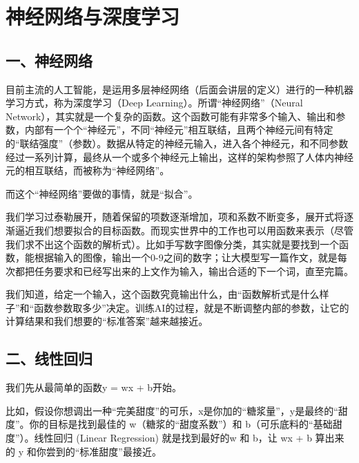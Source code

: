 \clearpage

\hypertarget{ux795eux7ecfux7f51ux7edcux4e0eux6df1ux5ea6ux5b66ux4e60}{%
\section{神经网络与深度学习}\label{ux795eux7ecfux7f51ux7edcux4e0eux6df1ux5ea6ux5b66ux4e60}}

\hypertarget{ux4e00ux795eux7ecfux7f51ux7edc}{%
\subsection{一、神经网络}\label{ux4e00ux795eux7ecfux7f51ux7edc}}

目前主流的人工智能，是运用多层神经网络（后面会讲层的定义）进行的一种机器学习方式，称为深度学习（Deep Learning）。所谓``神经网络''（Neural Network），其实就是一个复杂的函数。这个函数可能有非常多个输入、输出和参数，内部有一个个``神经元''，不同``神经元''相互联结，且两个神经元间有特定的``联结强度''（参数）。数据从特定的神经元输入，进入各个神经元，和不同参数经过一系列计算，最终从一个或多个神经元上输出，这样的架构参照了人体内神经元的相互联结，而被称为``神经网络''。

而这个``神经网络''要做的事情，就是``拟合''。

我们学习过泰勒展开，随着保留的项数逐渐增加，项和系数不断变多，展开式将逐渐逼近我们想要拟合的目标函数。而现实世界中的工作也可以用函数来表示（尽管我们求不出这个函数的解析式）。比如手写数字图像分类，其实就是要找到一个函数，能根据输入的图像，输出一个0-9之间的数字；让大模型写一篇作文，就是每次都把任务要求和已经写出来的上文作为输入，输出合适的下一个词，直至完篇。

我们知道，给定一个输入，这个函数究竟输出什么，由``函数解析式是什么样子''和``函数参数取多少''决定。训练AI的过程，就是不断调整内部的参数，让它的计算结果和我们想要的``标准答案''越来越接近。

\hypertarget{ux4e8cux7ebfux6027ux56deux5f52}{%
\subsection{二、线性回归}\label{ux4e8cux7ebfux6027ux56deux5f52}}

我们先从最简单的函数y = wx + b开始。

比如，假设你想调出一种``完美甜度''的可乐，x是你加的``糖浆量''，y是最终的``甜度''。你的目标是找到最佳的 w（糖浆的``甜度系数''）和 b（可乐底料的``基础甜度''）。线性回归 (Linear Regression) 就是找到最好的w 和 b，让 wx + b 算出来的 y 和你尝到的``标准甜度''最接近。

